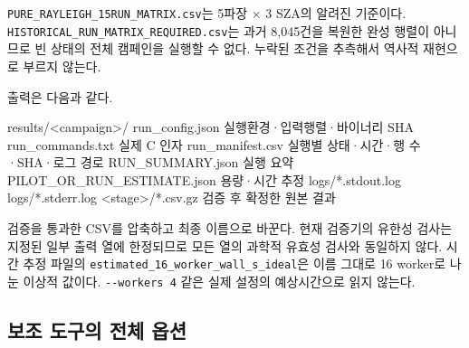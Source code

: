\texttt{PURE\_\allowbreak{}RAYLEIGH\_\allowbreak{}15RUN\_\allowbreak{}MATRIX.\allowbreak{}csv}는 5파장 \ensuremath{\times} 3 SZA의 알려진 기준이다. \texttt{HISTORICAL\_\allowbreak{}RUN\_\allowbreak{}MATRIX\_\allowbreak{}REQUIRED.\allowbreak{}csv}는 과거 8,045건을 복원한 완성 행렬이 아니므로 빈 상태의 전체 캠페인을 실행할 수 없다. 누락된 조건을 추측해서 역사적 재현으로 부르지 않는다.

출력은 다음과 같다.


\begin{ManualCode}
results/<campaign>/
  run_config.json             실행환경·입력행렬·바이너리 SHA
  run_commands.txt            실제 C 인자
  run_manifest.csv            실행별 상태·시간·행 수·SHA·로그 경로
  RUN_SUMMARY.json            실행 요약
  PILOT_OR_RUN_ESTIMATE.json  용량·시간 추정
  logs/*.stdout.log
  logs/*.stderr.log
  <stage>/*.csv.gz            검증 후 확정한 원본 결과
\end{ManualCode}

검증을 통과한 CSV를 압축하고 최종 이름으로 바꾼다. 현재 검증기의 유한성 검사는 지정된 일부 출력 열에 한정되므로 모든 열의 과학적 유효성 검사와 동일하지 않다. 시간 추정 파일의 \texttt{estimated\_\allowbreak{}16\_\allowbreak{}worker\_\allowbreak{}wall\_\allowbreak{}s\_\allowbreak{}ideal}은 이름 그대로 16 worker로 나눈 이상적 값이다. \texttt{-\allowbreak{}-\allowbreak{}workers 4} 같은 실제 설정의 예상시간으로 읽지 않는다.

\subsection{보조 도구의 전체 옵션}
\label{sec:auto:06_python_batch:10.3}

